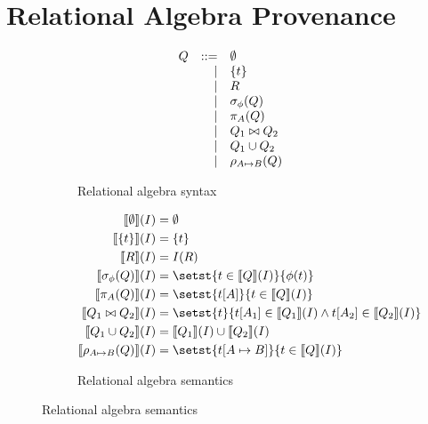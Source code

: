 \section{Relational Algebra Provenance}
\begin{figure}[h]
  \begin{subfigure}[b]{0.5\textwidth}
    \centering
    \[
      \begin{array}{rrl}
        Q & ::= & \emptyset \\
          &   | & \{t\} \\
          &   | & R \\
          &   | & \sigma_\phi(Q) \\
          &   | & \pi_A(Q) \\
          &   | & Q_1 \bowtie Q_2 \\
          &   | & Q_1 \cup Q_2 \\
          &   | & \rho_{A \mapsto B}(Q)
      \end{array}
    \]
    \caption{Relational algebra syntax}
    \label{fig:ra-syntax}
  \end{subfigure}
  \begin{subfigure}[b]{0.5\textwidth}
    \centering
    \[
      \begin{aligned}
        \denote{\emptyset}(I) &= \emptyset \\
        \denote{\set{t}}(I) &= \set{t} \\
        \denote{R}(I) &= I(R) \\
        \denote{\select_\phi(Q)}(I) &= \setst{t \in \denote{Q}(I)}{\phi(t)} \\
        \denote{\project_A(Q)}(I) &= \setst{t[A]}{t \in \denote{Q}(I)} \\
        \denote{Q_1 \join Q_2}(I) &= \setst{t}{t[A_1] \in \denote{Q_1}(I) \land t[A_2] \in \denote{Q_2}(I)} \\
        \denote{Q_1 \cup Q_2}(I) &= \denote{Q_1}(I) \cup \denote{Q_2}(I) \\
        \denote{\rename_{A \mapsto B}(Q)}(I) &= \setst{t[A \mapsto B]}{t \in \denote{Q}(I)}
      \end{aligned}
    \]
    \caption{Relational algebra semantics}
    \label{fig:ra-semantics}
  \end{subfigure}
\end{figure}

